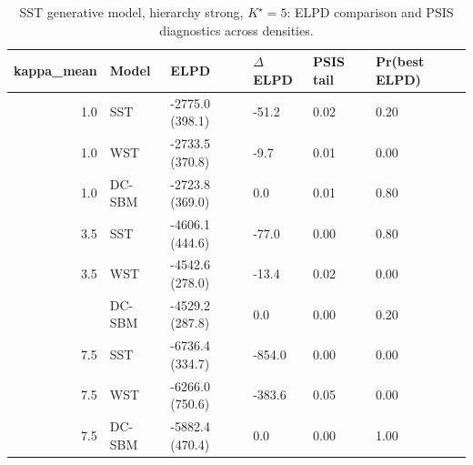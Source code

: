 \begin{table}
\centering
\caption{SST generative model, hierarchy strong, $K^\star=5$: ELPD comparison and PSIS diagnostics across densities.}
\centering
\begin{tabular}[t]{rlllll}
\toprule
kappa_mean & Model & ELPD & $\Delta$ELPD & PSIS tail & Pr(best ELPD)\\
\midrule
1.0 & SST & -2775.0 (398.1) & -51.2 & 0.02 & 0.20\\
1.0 & WST & -2733.5 (370.8) & -9.7 & 0.01 & 0.00\\
1.0 & DC-SBM & -2723.8 (369.0) & 0.0 & 0.01 & 0.80\\
3.5 & SST & -4606.1 (444.6) & -77.0 & 0.00 & 0.80\\
3.5 & WST & -4542.6 (278.0) & -13.4 & 0.02 & 0.00\\
\addlinespace
3.5 & DC-SBM & -4529.2 (287.8) & 0.0 & 0.00 & 0.20\\
7.5 & SST & -6736.4 (334.7) & -854.0 & 0.00 & 0.00\\
7.5 & WST & -6266.0 (750.6) & -383.6 & 0.05 & 0.00\\
7.5 & DC-SBM & -5882.4 (470.4) & 0.0 & 0.00 & 1.00\\
\bottomrule
\end{tabular}
\end{table}
